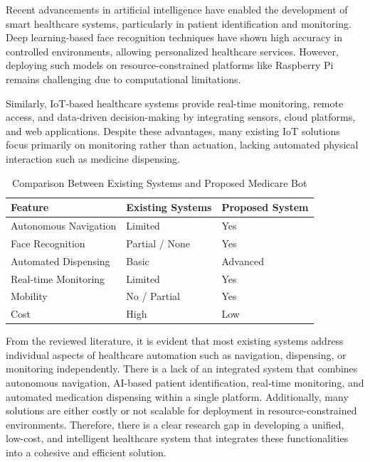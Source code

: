 Recent advancements in artificial intelligence have enabled the development of smart healthcare systems, particularly in patient identification and monitoring. Deep learning-based face recognition techniques have shown high accuracy in controlled environments, allowing personalized healthcare services. However, deploying such models on resource-constrained platforms like Raspberry Pi remains challenging due to computational limitations.

Similarly, IoT-based healthcare systems provide real-time monitoring, remote access, and data-driven decision-making by integrating sensors, cloud platforms, and web applications. Despite these advantages, many existing IoT solutions focus primarily on monitoring rather than actuation, lacking automated physical interaction such as medicine dispensing.

\begin{table}[H]
\centering
\begin{tabular}{|p{4.5cm}|p{5cm}|p{4.5cm}|}
\hline
\textbf{Feature} & \textbf{Existing Systems} & \textbf{Proposed System} \\
\hline
Autonomous Navigation & Limited & Yes \\
Face Recognition & Partial / None & Yes \\
Automated Dispensing & Basic & Advanced \\
Real-time Monitoring & Limited & Yes \\
Mobility & No / Partial & Yes \\
Cost & High & Low \\
\hline
\end{tabular}
\caption{Comparison Between Existing Systems and Proposed Medicare Bot}
\label{tab:system_comparison}
\end{table}

From the reviewed literature, it is evident that most existing systems address individual aspects of healthcare automation such as navigation, dispensing, or monitoring independently. There is a lack of an integrated system that combines autonomous navigation, AI-based patient identification, real-time monitoring, and automated medication dispensing within a single platform. Additionally, many solutions are either costly or not scalable for deployment in resource-constrained environments. Therefore, there is a clear research gap in developing a unified, low-cost, and intelligent healthcare system that integrates these functionalities into a cohesive and efficient solution.